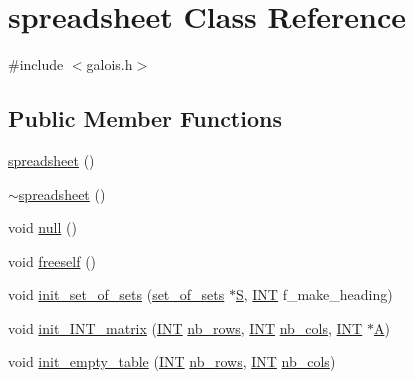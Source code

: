 \hypertarget{classspreadsheet}{}\section{spreadsheet Class Reference}
\label{classspreadsheet}


{\ttfamily \#include $<$galois.\+h$>$}

\subsection*{Public Member Functions}
\begin{DoxyCompactItemize}
\item 
\mbox{\hyperlink{classspreadsheet_a7b5f23e44aff5488302e827e33a1fad5}{spreadsheet}} ()
\item 
\mbox{\hyperlink{classspreadsheet_af22fe49defeebe5eac29e6fe3f2579cf}{$\sim$spreadsheet}} ()
\item 
void \mbox{\hyperlink{classspreadsheet_a69de03c34f8556d93388fe8c6233189c}{null}} ()
\item 
void \mbox{\hyperlink{classspreadsheet_a33d573e9994adb36c53e6ff673db9766}{freeself}} ()
\item 
void \mbox{\hyperlink{classspreadsheet_a4c201d5841da9152b0b08cc3f562f303}{init\+\_\+set\+\_\+of\+\_\+sets}} (\mbox{\hyperlink{classset__of__sets}{set\+\_\+of\+\_\+sets}} $\ast$\mbox{\hyperlink{simeon_8_c_adab47f8243f1b5a2c31df2535d6b37d0}{S}}, \mbox{\hyperlink{galois_8h_a09fddde158a3a20bd2dcadb609de11dc}{I\+NT}} f\+\_\+make\+\_\+heading)
\item 
void \mbox{\hyperlink{classspreadsheet_adfbf0142e2e06f810de8d6d6f0cfcebf}{init\+\_\+\+I\+N\+T\+\_\+matrix}} (\mbox{\hyperlink{galois_8h_a09fddde158a3a20bd2dcadb609de11dc}{I\+NT}} \mbox{\hyperlink{classspreadsheet_ab45da267ca261169cd72a7f7a8195efe}{nb\+\_\+rows}}, \mbox{\hyperlink{galois_8h_a09fddde158a3a20bd2dcadb609de11dc}{I\+NT}} \mbox{\hyperlink{classspreadsheet_a7914db2e3cf1e0a361e52107c4890ad1}{nb\+\_\+cols}}, \mbox{\hyperlink{galois_8h_a09fddde158a3a20bd2dcadb609de11dc}{I\+NT}} $\ast$\mbox{\hyperlink{simeon_8_c_a97833f04c3a9c008df5521a2fc291bb4}{A}})
\item 
void \mbox{\hyperlink{classspreadsheet_ad941232fa1d9ccf29fcebb8e56c15681}{init\+\_\+empty\+\_\+table}} (\mbox{\hyperlink{galois_8h_a09fddde158a3a20bd2dcadb609de11dc}{I\+NT}} \mbox{\hyperlink{classspreadsheet_ab45da267ca261169cd72a7f7a8195efe}{nb\+\_\+rows}}, \mbox{\hyperlink{galois_8h_a09fddde158a3a20bd2dcadb609de11dc}{I\+NT}} \mbox{\hyperlink{classspreadsheet_a7914db2e3cf1e0a361e52107c4890ad1}{nb\+\_\+cols}})

\end{DoxyCompactItemize}
